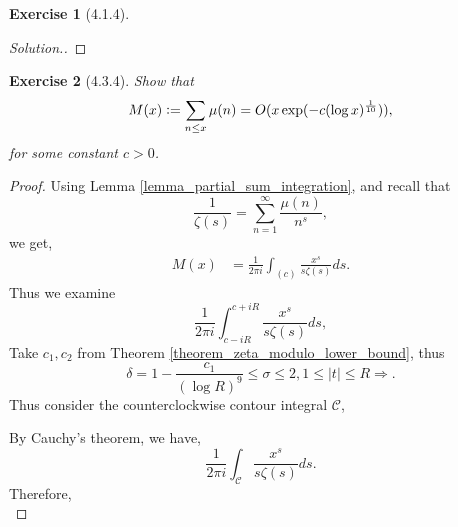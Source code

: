 \documentclass{article}
\newtheorem{exercise}{Exercise}[section]
\newcommand{\defeq}{\vcentcolon=}
\begin{document}
\begin{exercise}[4.1.4]
  
\end{exercise}
\begin{proof}[Solution.]
  
\end{proof}
\begin{exercise}[4.3.4]
  \label{exercise_4.3.4}
  Show that 
  \begin{equation*}
    M(x)\defeq\sum_{n\leq x}\mu(n) = O(x\exp(-c(\log x)^{{\frac 1 {10}}})),
  \end{equation*}
  for some constant $c>0$.
\end{exercise}
\begin{proof}
  Using Lemma \ref{lemma_partial_sum_integration}, and recall that 
  \begin{equation*}
    {\frac 1 {\zeta(s)}} = \sum_{n=1}^\infty {\frac {\mu(n)} {n^s}},
  \end{equation*}
  we get,
  \begin{align*}
    M(x) & = {\frac 1 {2\pi i}}\int_{(c)}{\frac {x^s} {s\zeta(s)}}ds.
  \end{align*}
  Thus we examine 
  \begin{equation*}
    {\frac 1 {2\pi i}}\int_{c-iR}^{c+iR}{\frac {x^s} {s\zeta(s)}}ds,
  \end{equation*}
  Take $c_1,c_2$ from Theorem \ref{theorem_zeta_modulo_lower_bound}, thus 
  \begin{equation*}
    \delta=1-{\frac {c_1} {(\log R)^9}}\leq \sigma\leq 2,1\leq \vert t\vert\leq R\Rightarrow.
  \end{equation*}
  Thus consider the counterclockwise contour integral $\mathcal{C}$,
      \begin{center}
\end{center}
By Cauchy's theorem, we have,
\begin{equation*}
  {\frac 1 {2\pi i}}\int_\mathcal{C}{\frac {x^s} {s\zeta(s)}}ds.
\end{equation*}
Therefore,
\begin{equation*}

\end{equation*}
\end{proof}
\end{document}

